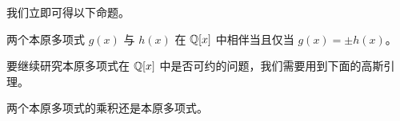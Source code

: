 我们立即可得以下命题。

\begin{proposition}
	两个本原多项式 $g(x)$ 与 $h(x)$ 在 $\mathbb Q[x]$ 中相伴当且仅当 $g(x) = \pm h(x)$。
\end{proposition}

要继续研究本原多项式在 $\mathbb Q[x]$ 中是否可约的问题，我们需要用到下面的高斯引理。

\begin{proposition}[高斯引理]
	两个本原多项式的乘积还是本原多项式。
\end{proposition}


